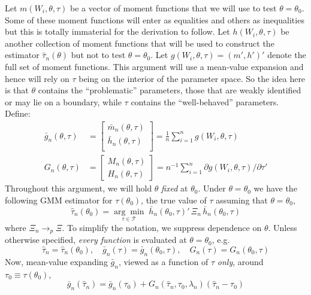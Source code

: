 \documentclass[12pt]{article}
\begin{document}
Let $m(W_i, \theta, \tau)$ be a vector of moment functions that we will use to test $\theta = \theta_0$.
Some of these moment functions will enter as equalities and others as inequalities but this is totally immaterial for the derivation to follow.
Let $h(W_i, \theta, \tau)$ be another collection of moment functions that will be used to construct the estimator $\widehat{\tau}_n(\theta)$ but not to test $\theta = \theta_0$.
Let $g(W_i, \theta, \tau) = (m', h')'$ denote the full set of moment functions.
This argument will use a mean-value expansion and hence will rely on $\tau$ being on the interior of the parameter space.
So the idea here is that $\theta$ contains the ``problematic'' parameters, those that are weakly identified or may lie on a boundary, while $\tau$ contains the ``well-behaved'' parameters.
Define: 
\begin{align*}
  \bar{g}_n(\theta, \tau) &= 
  \left[
  \begin{array}{c}
    \bar{m}_n(\theta, \tau)\\
    \bar{h}_n(\theta, \tau)\\
  \end{array}
\right] = 
  \frac{1}{n}\sum_{i=1}^n g(W_i, \theta, \tau) \\
G_n(\theta, \tau) &= \left[
\begin{array}{c}
  M_n(\theta, \tau)\\
  H_n(\theta, \tau)
\end{array}
\right] = n^{-1}\sum_{i=1}^n \partial g(W_i, \theta, \tau)/\partial \tau'
\end{align*}
Throughout this argument, we will hold $\theta$ \emph{fixed} at $\theta_0$.
Under $\theta = \theta_0$ we have the following GMM estimator for $\tau(\theta_0)$, the true value of $\tau$ assuming that $\theta = \theta_0$,
\[
  \widehat{\tau}_n(\theta_0) = \underset{\tau \in \mathscr{T}}{\arg \min} \; \bar{h}_n(\theta_0, \tau)'\, \Xi_n \, \bar{h}_n(\theta_0, \tau)
\]
where $\Xi_n \rightarrow_p \Xi$.
To simplify the notation, we suppress dependence on $\theta$.
Unless otherwise specified, \emph{every function} is evaluated at $\theta = \theta_0$, e.g.\ 
\[
  \widehat{\tau}_n = \widehat{\tau}_n(\theta_0), \quad \bar{g}_n(\tau) = \bar{g}_n(\theta_0, \tau), \quad G_n(\tau) = G_n(\theta_0, \tau)
\]
Now, mean-value expanding $\bar{g}_n$, viewed as a function of $\tau$ \emph{only}, around $\tau_0 \equiv \tau(\theta_0)$,
\begin{equation}
  \bar{g}_n\left(\widehat{\tau}_n\right) = \bar{g}_n(\tau_0) + G_n(\widehat{\tau}_n, \tau_0, \lambda_n) \left( \widehat{\tau}_n - \tau_0 \right)
  \label{eq:gn_MVE}
\end{equation}
\end{document}
